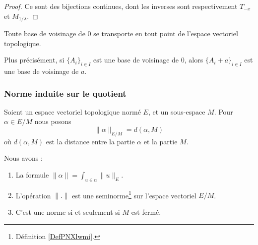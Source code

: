 \begin{proof}
	Ce sont des bijections continues, dont les inverses sont respectivement \( T_{-x} \) et \( M_{1/\lambda} \).
\end{proof}

\begin{corollary}\label{PropInvarianceTopologie}
	Toute base de voisinage de \( 0 \) se transporte en tout point de l'espace vectoriel topologique.

	Plus précisément, si \( \{ A_i \}_{i\in I}\) est une base de voisinage de \( 0\), alors \( \{ A_i+a \}_{i\in I}\) est une base de voisinage de \( a\).
\end{corollary}


\subsubsection{Norme induite sur le quotient}

\begin{propositionDef}       \label{PROPooDUAVooEfrEGI}
    Soient un espace vectoriel topologique normé \( E\), et un sous-espace \( M\). Pour \( \alpha\in E/M\) nous posons
    \begin{equation}
        \| \alpha \|_{E/M}=d(\alpha,M)
    \end{equation}
    où \( d(\alpha,M)\) est la distance entre la partie \( \alpha\) et la partie \( M\).

    Nous avons :
    \begin{enumerate}
        \item       \label{ITEMooQOZXooZiZdTn}
            La formule \( \| \alpha \|=\int_{u\in \alpha}\| u \|_E\).
        \item       \label{ITEMooFEOGooTTDgCj}
            L'opération \( \| . \|\) est une seminorme\footnote{Définition \ref{DefPNXlwmi}.} sur l'espace vectoriel \( E/M\).
        \item       \label{ITEMooWCCSooMeqQHL}
            C'est une norme si et seulement si \( M\) est fermé.
    \end{enumerate}
\end{propositionDef}

